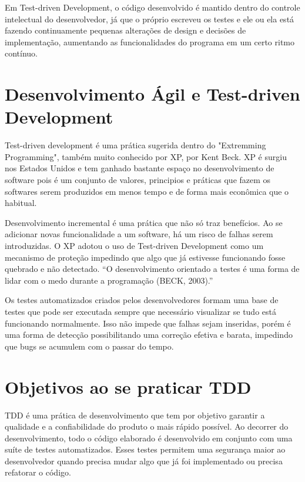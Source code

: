 \documentclass[12pt]{article}
\begin{document}
  Em Test-driven Development, o código desenvolvido é mantido dentro do controle
  intelectual do desenvolvedor, já que o próprio escreveu os testes e ele ou 
  ela está fazendo continuamente pequenas alterações de design e decisões de 
  implementação, aumentando as funcionalidades do programa em um certo ritmo 
  contínuo.

  \section{Desenvolvimento Ágil e Test-driven Development}

  Test-driven development é uma prática sugerida dentro do "Extremming 
  Programming", também muito conhecido por XP, por Kent Beck. XP é surgiu nos
  Estados Unidos e tem ganhado bastante espaço no desenvolvimento de software
  pois é um conjunto de valores, principios e práticas que fazem os softwares 
  serem produzidos em menos tempo e de forma mais econômica que o habitual.

  Desenvolvimento incremental é uma prática que não só traz benefícios. Ao se
  adicionar novas funcionalidade a um software, há um risco de falhas serem 
  introduzidas. O XP adotou o uso de Test-driven Development como um mecanismo
  de proteção impedindo que algo que já estivesse funcionando fosse quebrado
  e não detectado. “O desenvolvimento orientado a testes é uma forma de lidar 
  com o medo durante a programação (BECK, 2003).”

  Os testes automatizados criados pelos desenvolvedores formam uma base de 
  testes que pode ser executada sempre que necessário visualizar se tudo está
  funcionando normalmente. Isso não impede que falhas sejam inseridas, porém
  é uma forma de detecção possibilitando uma correção efetiva e barata, impedindo
  que bugs se acumulem com o passar do tempo.

  \section{Objetivos ao se praticar TDD}

  TDD é uma prática de desenvolvimento que tem por objetivo garantir a
  qualidade e a confiabilidade do produto o mais rápido possível. Ao decorrer do
  desenvolvimento, todo o código elaborado é desenvolvido em conjunto com uma
  suíte de testes automatizados. Esses testes permitem uma segurança maior ao
  desenvolvedor quando precisa mudar algo que já foi implementado ou precisa 
  refatorar o código.
\end{document}
